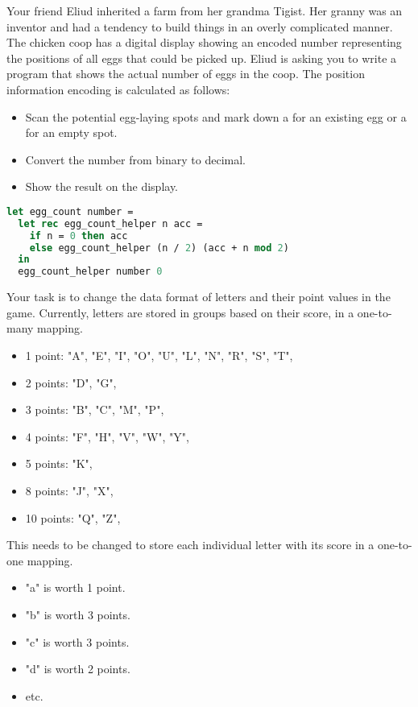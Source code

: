 Your friend Eliud inherited a farm from her grandma Tigist.
Her granny was an inventor and had a tendency to build things in an overly complicated manner.
The chicken coop has a digital display showing an encoded number representing the positions of all eggs that could be picked up.
Eliud is asking you to write a program that shows the actual number of eggs in the coop.
The position information encoding is calculated as follows:

\begin{itemize}
  \item Scan the potential egg-laying spots and mark down a  for an existing egg or a  for an empty spot.
  \item Convert the number from binary to decimal.
  \item Show the result on the display.
\end{itemize}

\begin{lstlisting}[language=OCaml]
let egg_count number =
  let rec egg_count_helper n acc =
    if n = 0 then acc
    else egg_count_helper (n / 2) (acc + n mod 2)
  in
  egg_count_helper number 0
\end{lstlisting}

\problem[ETL]
Your task is to change the data format of letters and their point values in the game.
Currently, letters are stored in groups based on their score, in a one-to-many mapping.
\begin{itemize}
  \item 1 point: "A", "E", "I", "O", "U", "L", "N", "R", "S", "T",
  \item 2 points: "D", "G",
  \item 3 points: "B", "C", "M", "P",
  \item 4 points: "F", "H", "V", "W", "Y",
  \item 5 points: "K",
  \item 8 points: "J", "X",
  \item 10 points: "Q", "Z",
\end{itemize}
This needs to be changed to store each individual letter with its score in a one-to-one mapping.
\begin{itemize}
  \item "a" is worth 1 point.
  \item "b" is worth 3 points.
  \item "c" is worth 3 points.
  \item "d" is worth 2 points.
  \item etc.
\end{itemize}

